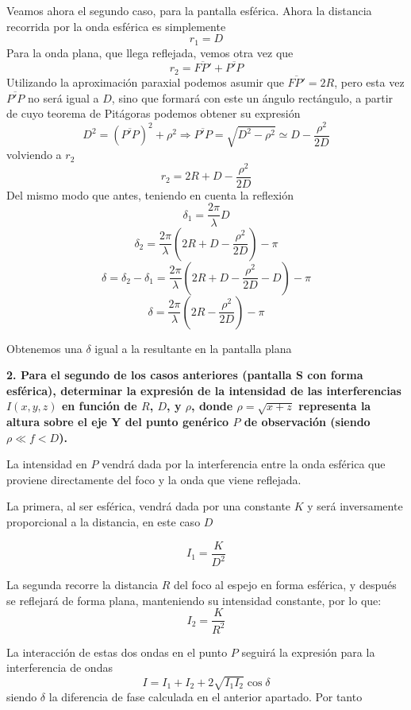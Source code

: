 \documentclass[a4paper,12pt,spanish]{article}
\begin{document}
\vspace{\baselineskip}
Veamos ahora el segundo caso, para la pantalla esférica. Ahora la distancia recorrida por la onda esférica es simplemente
\[ r_1 = D
\]
Para la onda plana, que llega reflejada, vemos otra vez que 
\[ r_2 = \overline{FP'}+ \overline{P'P}
\]
Utilizando la aproximación paraxial podemos asumir que $\overline{FP'} = 2R$, pero esta vez $\overline{P'P}$ no será igual a $D$, sino que formará con este un ángulo rectángulo, a partir de cuyo teorema de Pitágoras podemos obtener su expresión
\[ D^2 =  (\overline{P'P})^2 + \rho^2 \Longrightarrow \overline{P'P} = \sqrt{D^2 - \rho^2} \simeq D - \frac{\rho^2}{2D}
\]
volviendo a $r_2$
\[ r_2 = 2R + D - \frac{\rho^2}{2D}
\]
Del mismo modo que antes, teniendo en cuenta la reflexión
\[ \delta_1 = \frac{2\pi}{\lambda} D
\]
\[ \delta_2 =  \frac{2\pi}{\lambda} ( 2R + D - \frac{\rho^2}{2D}) - \pi 
\]
\[ \delta = \delta_2 - \delta_1 = \frac{2\pi}{\lambda} (2R + D-\frac{\rho^2}{2D}- D) - \pi
\]
\[ \boxed{  \delta =  \frac{2\pi}{\lambda} (2R - \frac{\rho^2}{2D}) - \pi }
\]

Obtenemos una $\delta$ igual a la resultante en la pantalla plana

\vspace{\baselineskip}

\textbf{2. Para el segundo de los casos anteriores (pantalla S con forma esférica),
	determinar la expresión de la intensidad
	de las interferencias $I(x, y, z)$ en
	función de $R$, $D$, y $\rho$, donde $\rho = \sqrt{x + z}$  representa la altura sobre el eje Y del punto genérico $P$ de observación (siendo $\rho \ll f < D$).
}
\vspace{\baselineskip}

La intensidad en $P$ vendrá dada por la interferencia entre la onda esférica que proviene directamente del foco y la onda que viene reflejada.

La primera, al ser esférica, vendrá dada por una constante $K$ y será inversamente proporcional a la distancia, en este caso $D$

\[ I_1 = \frac{K}{D^2}
\]

La segunda recorre la distancia $R$ del foco al espejo en forma esférica, y después se reflejará de forma plana, manteniendo su intensidad constante, por lo que:
\[ I_2 = \frac{K}{R^2}
\]

La interacción de estas dos ondas en el punto $P$ seguirá la expresión para la interferencia de ondas 
\[ I = I_1 + I_2 + 2\sqrt{I_1 I_2} \cos \delta
\]
siendo $\delta$ la diferencia de fase calculada en el anterior apartado. Por tanto
\end{document}
